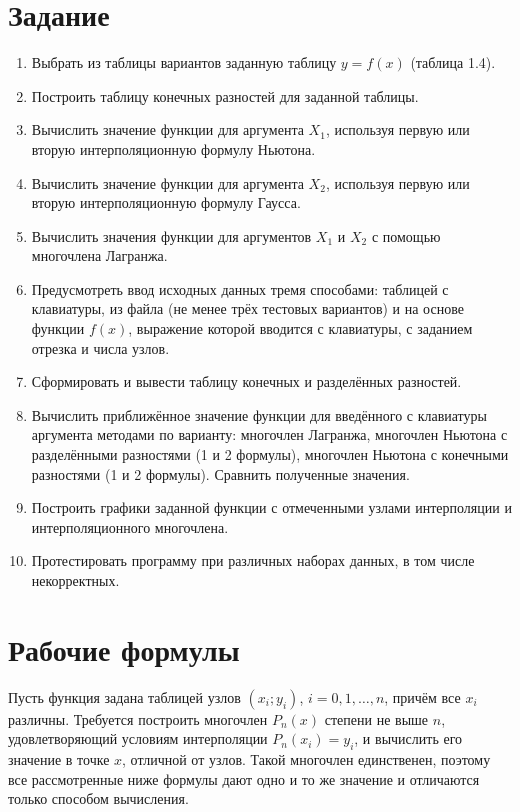 \documentclass[12pt,a4paper]{article}
\begin{document}
\section*{Задание}
\begin{enumerate}
    \item Выбрать из таблицы вариантов заданную таблицу $y=f(x)$ (таблица 1.4).
    \item Построить таблицу конечных разностей для заданной таблицы.
    \item Вычислить значение функции для аргумента $X_1$, используя первую или вторую интерполяционную формулу Ньютона.
    \item Вычислить значение функции для аргумента $X_2$, используя первую или вторую интерполяционную формулу Гаусса.
    \item Вычислить значения функции для аргументов $X_1$ и $X_2$ с помощью многочлена Лагранжа.
    \item Предусмотреть ввод исходных данных тремя способами: таблицей с клавиатуры, из файла (не менее трёх тестовых вариантов) и на основе функции $f(x)$, выражение которой вводится с клавиатуры, с заданием отрезка и числа узлов.
    \item Сформировать и вывести таблицу конечных и разделённых разностей.
    \item Вычислить приближённое значение функции для введённого с клавиатуры аргумента методами по варианту: многочлен Лагранжа, многочлен Ньютона с разделёнными разностями (1 и 2 формулы), многочлен Ньютона с конечными разностями (1 и 2 формулы). Сравнить полученные значения.
    \item Построить графики заданной функции с отмеченными узлами интерполяции и интерполяционного многочлена.
    \item Протестировать программу при различных наборах данных, в том числе некорректных.
\end{enumerate}

\section*{Рабочие формулы}
Пусть функция задана таблицей узлов $(x_i;y_i)$, $i=0,1,\ldots,n$, причём все $x_i$ различны. Требуется построить многочлен $P_n(x)$ степени не выше $n$, удовлетворяющий условиям интерполяции $P_n(x_i)=y_i$, и вычислить его значение в точке $x$, отличной от узлов. Такой многочлен единственен, поэтому все рассмотренные ниже формулы дают одно и то же значение и отличаются только способом вычисления.
\end{document}
